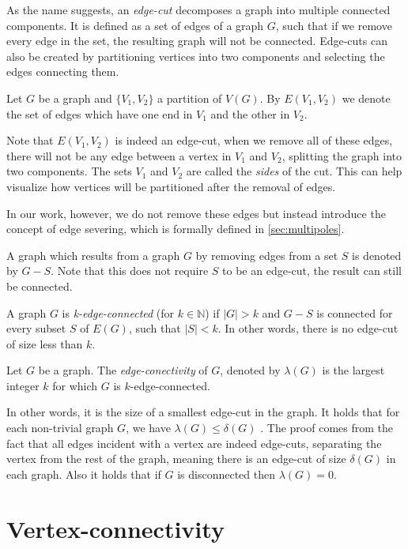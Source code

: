 \documentclass[12pt, twoside]{book}
\begin{document}
As the name suggests, an \textit{edge-cut} decomposes a graph into multiple connected components. It is defined as a set of edges of a graph $G$, such that if we remove every edge in the set, the resulting graph will not be connected. Edge-cuts can also be created by partitioning vertices into two components and selecting the edges connecting them.

\begin{definition}
	Let $G$ be a graph and $\{V_1,V_2\}$ a partition of $V(G)$. By $E(V_1,V_2)$ we denote the set of edges which have one end in $V_1$ and the other in $V_2$.
\end{definition}

Note that $E(V_1,V_2)$ is indeed an edge-cut, when we remove all of these edges, there will not be any edge between a vertex in $V_1$ and $V_2$, splitting the graph into two components. The sets $V_1$ and $V_2$ are called the \textit{sides} of the cut. This can help visualize how vertices will be partitioned after the removal of edges.

In our work, however, we do not remove these edges but instead introduce the concept of edge severing, which is formally defined in \cref{sec:multipoles}.

A graph which results from a graph $G$ by removing edges from a set $S$ is denoted by $G-S$. Note that this does not require $S$ to be an edge-cut, the result can still be connected.

A graph $G$ is \textit{k-edge-connected} (for $k\in\mathbb{N}$) if $|G|>k$ and $G-S$ is connected for every subset $S$ of $E(G)$, such that $|S|<k$. In other words, there is no edge-cut of size less than $k$.

\begin{definition}
	Let $G$ be a graph. The \textit{edge-conectivity} of $G$, denoted by $\lambda(G)$ is the largest integer $k$ for which $G$ is $k$-edge-connected.
\end{definition}

In other words, it is the size of a smallest edge-cut in the graph. It holds that for each non-trivial graph $G$, we have $\lambda(G)\leq\delta(G)$ \cite{Diestel}. The proof comes from the fact that all edges incident with a vertex are indeed edge-cuts, separating the vertex from the rest of the graph, meaning there is an edge-cut of size $\delta(G)$ in each graph. Also it holds that if $G$ is disconnected then $\lambda(G)=0$.

\section{Vertex-connectivity}
\end{document}
